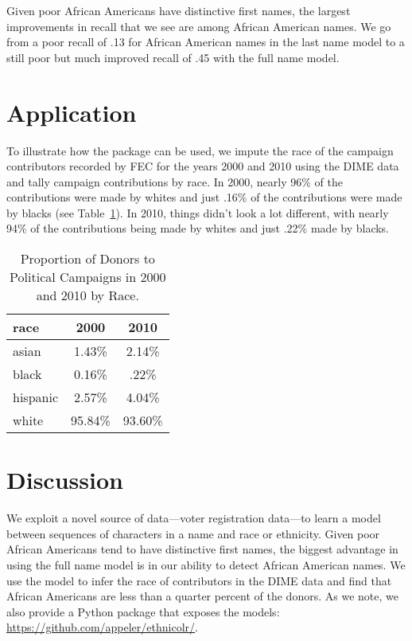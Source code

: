 \documentclass[12pt, letterpaper]{article}
\begin{document}
Given poor African Americans have distinctive first names, the largest improvements in recall that we see are among African American names. We go from a poor recall of .13 for African American names in the last name model to a still poor but much improved recall of .45 with the full name model.

\section*{Application}
To illustrate how the package can be used, we impute the race of the campaign contributors recorded by FEC for the years 2000 and 2010 using the DIME data \citep{bonica2017database} and tally campaign contributions by race. In 2000, nearly 96\% of the contributions were made by whites and just .16\% of the contributions were made by blacks (see Table~\ref{table:percentage_contrib_by_race}). In 2010, things didn't look a lot different, with nearly 94\% of the contributions being made by whites and just .22\% made by blacks.

\begin{table}[h!]
\centering
\caption{Proportion of Donors to Political Campaigns in 2000 and 2010 by Race.}
\begin{tabular}{ l c  c}
\hline	
race & 2000  & 2010 \\	
\hline
asian & 	1.43\%  & 2.14\%\\
black & 	0.16\%  & .22\%\\
hispanic & 	2.57\%  & 4.04\%\\
white & 	95.84\%  & 93.60\%\\
\hline
\end{tabular}
\label{table:percentage_contrib_by_race}
\end{table}

\section*{Discussion}
We exploit a novel source of data---voter registration data---to learn a model between sequences of characters in a name and race or ethnicity. Given poor African Americans tend to have distinctive first names, the biggest advantage in using the full name model is in our ability to detect African American names. We use the model to infer the race of contributors in the DIME data and find that African Americans are less than a quarter percent of the donors. As we note, we also provide a Python package that exposes the models: \url{https://github.com/appeler/ethnicolr/}.
\end{document}
